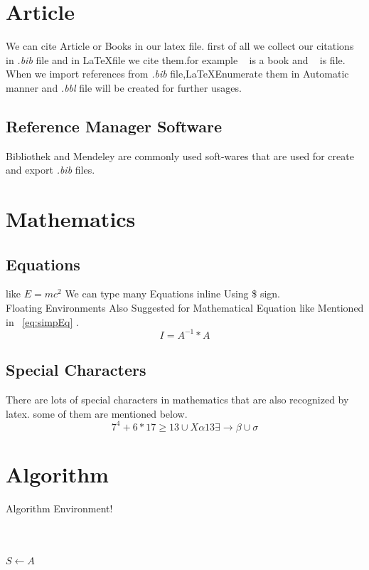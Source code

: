 \documentclass{article}
\begin{document}
	\section{Article}

		We can cite Article or Books in our latex file. first of all we collect our citations in \emph{.bib} file and in \LaTeX file we cite them.for example ~\cite{smit54} is a book and ~\cite{LaTeX} is file.\\
		When we import references from \emph{.bib} file,\LaTeX Enumerate them in Automatic manner and \emph{.bbl} file will be created for further usages.
		\subsection{Reference Manager Software}
			Bibliothek and Mendeley are commonly used soft-wares that are used for create and export \emph{.bib} files.
	\section{Mathematics}
		\subsection{Equations}
			like $E=mc^2$ We can type many Equations inline Using \$ sign.\\
			Floating Environments Also Suggested for Mathematical Equation like  Mentioned in ~\ref{eq:simpEq} .
			\begin{equation}
				I=A^{-1}*A
				\label{eq:simpEq}
			\end{equation}
		\subsection{Special Characters}
			There are lots of special characters in mathematics that are also recognized by latex. some of them are mentioned below.
			\begin{equation}
				7^4+6*17\geq  13\cup X\alpha 13\exists \rightarrow \beta \cup \sigma
			\end{equation}
	\section{Algorithm}
		Algorithm Environment!
		\begin{algorithmic}
			\\
				\\
					$S \leftarrow A$ 
				\EndIf
			\EndProcedure
		\end{algorithmic}
\end{document}
